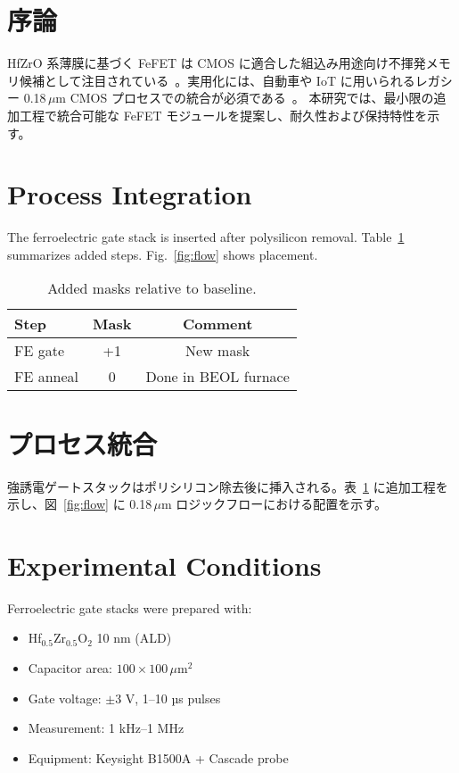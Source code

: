 \documentclass[journal]{IEEEtran}
\begin{document}
\section*{序論}
HfZrO 系薄膜に基づく FeFET は CMOS に適合した組込み用途向け不揮発メモリ候補として注目されている~\cite{boscke2011hafnium,mueller2012fefet}。実用化には、自動車や IoT に用いられるレガシー 0.18\,$\mu$m CMOS プロセスでの統合が必須である~\cite{mitsubishi2003automotive}。  
本研究では、最小限の追加工程で統合可能な FeFET モジュールを提案し、耐久性および保持特性を示す。

\section{Process Integration}
The ferroelectric gate stack is inserted after polysilicon removal. Table~\ref{tab:masks} summarizes added steps. Fig.~\ref{fig:flow} shows placement.

\begin{table}[!t]
  \centering
  \caption{Added masks relative to baseline.}
  \label{tab:masks}
  \begin{tabular}{@{}lcc@{}}
    \toprule
    Step & Mask & Comment \\
    \midrule
    FE gate & +1 & New mask \\
    FE anneal & 0 & Done in BEOL furnace \\
    \bottomrule
  \end{tabular}
\end{table}

\section*{プロセス統合}
強誘電ゲートスタックはポリシリコン除去後に挿入される。表~\ref{tab:masks} に追加工程を示し、図~\ref{fig:flow} に 0.18\,$\mu$m ロジックフローにおける配置を示す。

\section{Experimental Conditions}
Ferroelectric gate stacks were prepared with:
\begin{itemize}
\item Hf$_{0.5}$Zr$_{0.5}$O$_2$ 10 nm (ALD)
\item Capacitor area: $100\times100\,\mu$m$^2$
\item Gate voltage: $\pm$3 V, 1--10 µs pulses
\item Measurement: 1 kHz–1 MHz
\item Equipment: Keysight B1500A + Cascade probe
\end{itemize}
\end{document}
